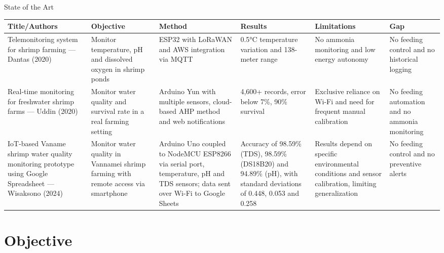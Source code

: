 \documentclass[aspectratio=169]{beamer}
\begin{document}
{
\usebackgroundtemplate{}
\begin{frame}[t]{State of the Art}

\begin{table}
    \centering
    \tiny
    \begin{tabular}{|L{2.5cm}|L{2cm}|L{2cm}|L{2cm}|L{2cm}|L{1.5cm}|}
      \hline
      \textbf{Title/Authors} & \textbf{Objective} & \textbf{Method} & \textbf{Results} & \textbf{Limitations} & \textbf{Gap} \\
      \hline
      Telemonitoring system for shrimp farming — Dantas (2020) & Monitor temperature, pH and dissolved oxygen in shrimp ponds & ESP32 with LoRaWAN and AWS integration via MQTT & 0.5°C temperature variation and 138-meter range & No ammonia monitoring and low energy autonomy & No feeding control and no historical logging \\
      \hline
      Real-time monitoring for freshwater shrimp farms — Uddin (2020) & Monitor water quality and survival rate in a real farming setting & Arduino Yun with multiple sensors, cloud-based AHP method and web notifications & 4,600+ records, error below 7\%, 90\% survival & Exclusive reliance on Wi-Fi and need for frequent manual calibration & No feeding automation and no ammonia monitoring \\
      \hline
      IoT-based Vaname shrimp water quality monitoring prototype using Google Spreadsheet — Wisaksono (2024) & Monitor water quality in Vannamei shrimp farming with remote access via smartphone & Arduino Uno coupled to NodeMCU ESP8266 via serial port, temperature, pH and TDS sensors; data sent over Wi-Fi to Google Sheets & Accuracy of 98.59\% (TDS), 98.59\% (DS18B20) and 94.89\% (pH), with standard deviations of 0.448, 0.053 and 0.258 & Results depend on specific environmental conditions and sensor calibration, limiting generalization & No feeding control and no preventive alerts \\
      \hline
    \end{tabular}
  \end{table}
\end{frame}
}

\section{Objective}
\end{document}
